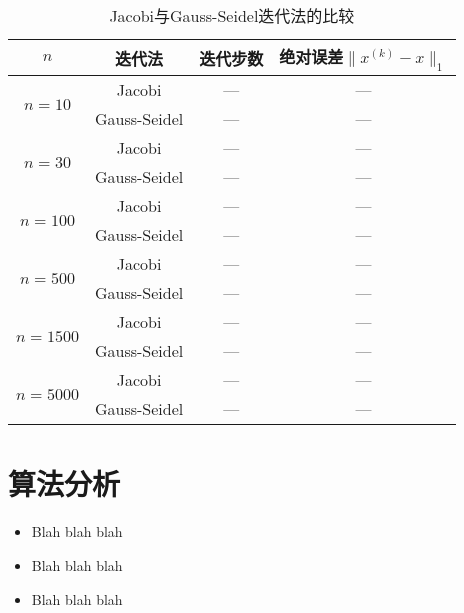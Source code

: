 \documentclass[UTF8]{ctexart}
\begin{document}
    \begin{table}[ht]
        \centering
        \begin{tabular}{|c|c|c|c|}
            \hline
            $n$                          & 迭代法           & 迭代步数                & 绝对误差$\|x^{(k)}-x\|_1$\\
            \hline
            \multirow{2}{*}{$n=10$}      & Jacobi          & ---                   & ---                     \\
                                         & Gauss-Seidel    & ---                   & ---                     \\
            \hline
            \multirow{2}{*}{$n=30$}      & Jacobi          & ---                   & ---                     \\
                                         & Gauss-Seidel    & ---                   & ---                     \\
            \hline
            \multirow{2}{*}{$n=100$}     & Jacobi          & ---                   & ---                     \\
                                         & Gauss-Seidel    & ---                   & ---                     \\
            \hline
            \multirow{2}{*}{$n=500$}     & Jacobi          & ---                   & ---                     \\
                                         & Gauss-Seidel    & ---                   & ---                     \\
            \hline
            \multirow{2}{*}{$n=1500$}    & Jacobi          & ---                   & ---                     \\
                                         & Gauss-Seidel    & ---                   & ---                     \\
            \hline
            \multirow{2}{*}{$n=5000$}    & Jacobi          & ---                   & ---                     \\
                                         & Gauss-Seidel    & ---                   & ---                     \\
            \hline
        \end{tabular}
        \caption{Jacobi与Gauss-Seidel迭代法的比较}
        \label{tab:tab1}
    \end{table}


\section{算法分析}
    \begin{itemize}
        \item Blah blah blah
        \item Blah blah blah
        \item Blah blah blah
    \end{itemize}
\end{document}
